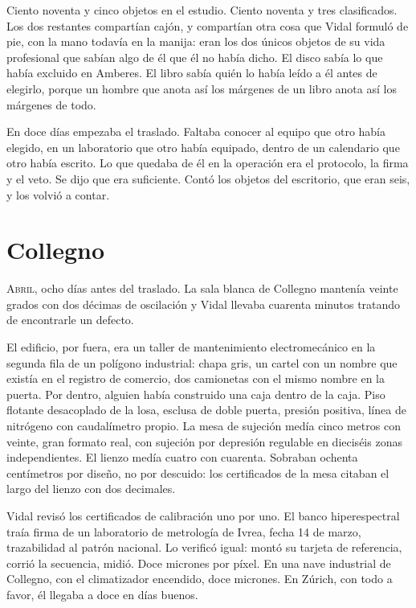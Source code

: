 Ciento noventa y cinco objetos en el estudio. Ciento noventa y tres clasificados. Los dos restantes compartían cajón, y compartían otra cosa que Vidal formuló de pie, con la mano todavía en la manija: eran los dos únicos objetos de su vida profesional que sabían algo de él que él no había dicho. El disco sabía lo que había excluido en Amberes. El libro sabía quién lo había leído a él antes de elegirlo, porque un hombre que anota así los márgenes de un libro anota así los márgenes de todo.

En doce días empezaba el traslado. Faltaba conocer al equipo que otro había elegido, en un laboratorio que otro había equipado, dentro de un calendario que otro había escrito. Lo que quedaba de él en la operación era el protocolo, la firma y el veto. Se dijo que era suficiente. Contó los objetos del escritorio, que eran seis, y los volvió a contar.

\clearpage

\chapter{Collegno}

\lettrine[lines=2, lhang=0.1, nindent=0.2em]{A}{bril,} ocho días antes del traslado. La sala blanca de Collegno mantenía veinte grados con dos décimas de oscilación y Vidal llevaba cuarenta minutos tratando de encontrarle un defecto.


El edificio, por fuera, era un taller de mantenimiento electromecánico en la segunda fila de un polígono industrial: chapa gris, un cartel con un nombre que existía en el registro de comercio, dos camionetas con el mismo nombre en la puerta. Por dentro, alguien había construido una caja dentro de la caja. Piso flotante desacoplado de la losa, esclusa de doble puerta, presión positiva, línea de nitrógeno con caudalímetro propio. La mesa de sujeción medía cinco metros con veinte, gran formato real, con sujeción por depresión regulable en dieciséis zonas independientes. El lienzo medía cuatro con cuarenta. Sobraban ochenta centímetros por diseño, no por descuido: los certificados de la mesa citaban el largo del lienzo con dos decimales.

Vidal revisó los certificados de calibración uno por uno. El banco hiperespectral traía firma de un laboratorio de metrología de Ivrea, fecha 14 de marzo, trazabilidad al patrón nacional. Lo verificó igual: montó su tarjeta de referencia, corrió la secuencia, midió. Doce micrones por píxel. En una nave industrial de Collegno, con el climatizador encendido, doce micrones. En Zúrich, con todo a favor, él llegaba a doce en días buenos.

